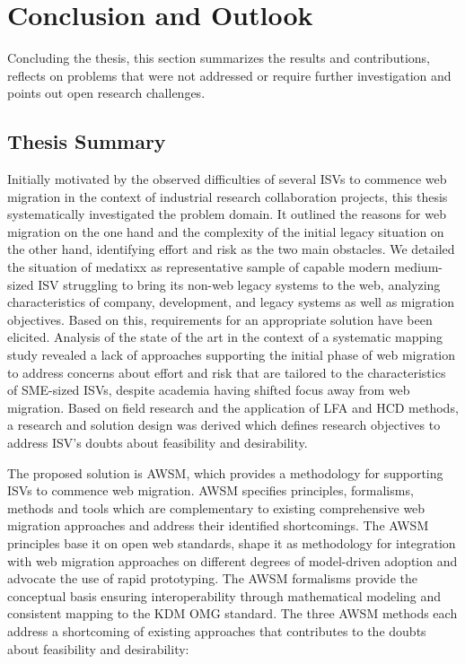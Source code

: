 \hypertarget{sec:conclusion}{%
\chapter{Conclusion and Outlook}\label{sec:conclusion}}

Concluding the thesis, this section summarizes the results and contributions, reflects on problems that were not addressed or require further investigation and points out open research challenges.

\hypertarget{thesis-summary}{%
\section{Thesis Summary}\label{thesis-summary}}

Initially motivated by the observed difficulties of several ISVs to commence web migration in the context of industrial research collaboration projects, this thesis systematically investigated the problem domain.
It outlined the reasons for web migration on the one hand and the complexity of the initial legacy situation on the other hand, identifying effort and risk as the two main obstacles.
We detailed the situation of medatixx as representative sample of capable modern medium-sized ISV struggling to bring its non-web legacy systems to the web, analyzing characteristics of company, development, and legacy systems as well as migration objectives.
Based on this, requirements for an appropriate solution have been elicited.
Analysis of the state of the art in the context of a systematic mapping study revealed a lack of approaches supporting the initial phase of web migration to address concerns about effort and risk that are tailored to the characteristics of SME-sized ISVs, despite academia having shifted focus away from web migration.
Based on field research and the application of LFA and HCD methods, a research and solution design was derived which defines research objectives to address ISV's doubts about feasibility and desirability.

The proposed solution is AWSM, which provides a methodology for supporting ISVs to commence web migration.
AWSM specifies principles, formalisms, methods and tools which are complementary to existing comprehensive web migration approaches and address their identified shortcomings.
The AWSM principles base it on open web standards, shape it as methodology for integration with web migration approaches on different degrees of model-driven adoption and advocate the use of rapid prototyping.
The AWSM formalisms provide the conceptual basis ensuring interoperability through mathematical modeling and consistent mapping to the KDM OMG standard.
The three AWSM methods each address a shortcoming of existing approaches that contributes to the doubts about feasibility and desirability:

